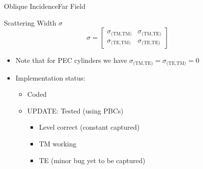 \begin{frame}[allowframebreaks]{Oblique Incidence}{Far Field}
\begin{enumerate}
    \end{enumerate}
    
    \framebreak %

    \begin{block}{Scattering Width $\sigma$}
      \begin{equation*}
        \sigma =
        \begin{bmatrix}
          \sigma_{\text{(TM,TM)}} & \sigma_{\text{(TM,TE)}} \\
          \sigma_{\text{(TE,TM)}} & \sigma_{\text{(TE,TE)}} 
        \end{bmatrix}
      \end{equation*}

      \begin{itemize}
      \item Note that for PEC cylinders we have
        $\sigma_{\text{(TM,TE)}}=\sigma_{\text{(TE,TM)}}=0$
      \end{itemize}
      
    \end{block}


    \vspace{\baselineskip}
   
    
    \begin{itemize}
    \item Implementation status:
      \begin{itemize}
      \item Coded
      \item \alert{UPDATE: Tested (using PBCs)}
        \begin{itemize}
        \item Level correct (constant captured)
        \item TM working
        \item TE (minor bug yet to be captured)
        \end{itemize}
      \end{itemize}
    \end{itemize}
    
\end{frame}
  

